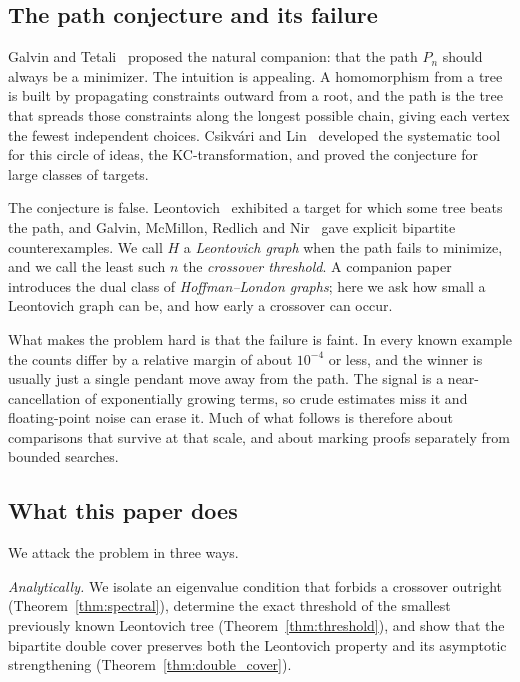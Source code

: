 \subsection{The path conjecture and its failure}

Galvin and Tetali~\cite{galvin-tetali} proposed the natural companion:
that the path $P_n$ should always be a minimizer. The intuition is
appealing. A homomorphism from a tree is built by propagating
constraints outward from a root, and the path is the tree that spreads
those constraints along the longest possible chain, giving each vertex
the fewest independent choices. Csikv\'ari and Lin~\cite{csikvari-lin}
developed the systematic tool for this circle of ideas, the
KC-transformation, and proved the conjecture for large classes of
targets.

The conjecture is false. Leontovich~\cite{leontovich1989} exhibited a
target for which some tree beats the path, and
Galvin, McMillon, Redlich and Nir~\cite{galvin2025} gave explicit
bipartite counterexamples. We call $H$ a \emph{Leontovich graph} when
the path fails to minimize, and we call the least such $n$ the
\emph{crossover threshold}. A companion paper~\cite{galvin2026}
introduces the dual class of \emph{Hoffman--London graphs}; here we ask
how small a Leontovich graph can be, and how early a crossover can
occur.

What makes the problem hard is that the failure is faint. In every known
example the counts differ by a relative margin of about $10^{-4}$ or
less, and the winner is usually just a single pendant move away from the
path. The signal is a near-cancellation of exponentially growing terms,
so crude estimates miss it and floating-point noise can erase it. Much
of what follows is therefore about comparisons that survive at that
scale, and about marking proofs separately from bounded searches.

\subsection{What this paper does}

We attack the problem in three ways.

\emph{Analytically.} We isolate an eigenvalue condition that forbids a
crossover outright (Theorem~\ref{thm:spectral}), determine the exact
threshold of the smallest previously known Leontovich tree
(Theorem~\ref{thm:threshold}), and show that the bipartite double cover
preserves both the Leontovich property and its asymptotic strengthening
(Theorem~\ref{thm:double_cover}).

